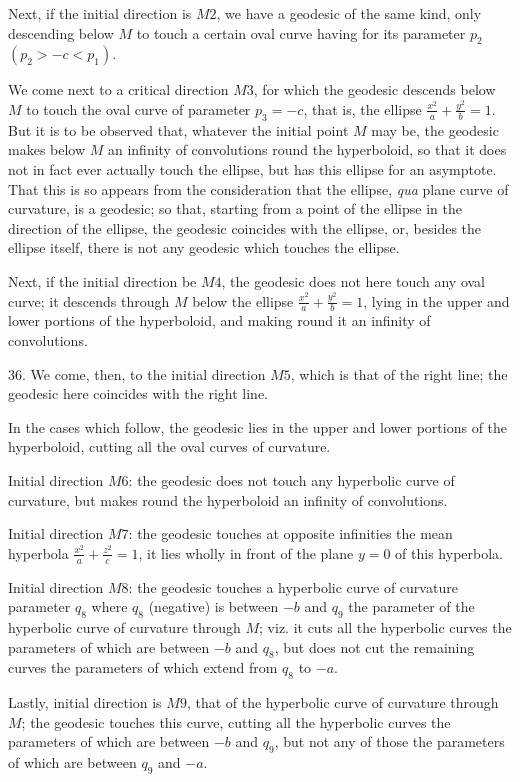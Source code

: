 \documentclass[11pt,a4paper]{article}
\begin{document}
Next, if the initial direction is $M2$, we have a geodesic of the same kind, only descending
below $M$ to touch a certain oval curve having for its parameter $p_2$ $(p_2>-c<p_1)$.

We come next to a critical direction $M3$, for which the geodesic descends below $M$ to
touch the oval curve of parameter $p_3=-c$, that is, the ellipse
$\frac{x^2}{a}+\frac{y^2}{b}=1$. But it is to be observed that, whatever the initial point
$M$ may be, the geodesic makes below $M$ an infinity of convolutions round the hyperboloid,
so that it does not in fact ever actually touch the ellipse, but has this ellipse for an
asymptote. That this is so appears from the consideration that the ellipse, \emph{qua} plane
curve of curvature, is a geodesic; so that, starting from a point of the ellipse in the
direction of the ellipse, the geodesic coincides with the ellipse, or, besides the ellipse
itself, there is not any geodesic which touches the ellipse.

Next, if the initial direction be $M4$, the geodesic does not here touch any oval curve;
it descends through $M$ below the ellipse $\frac{x^2}{a}+\frac{y^2}{b}=1$, lying in the
upper and lower portions of the hyperboloid, and making round it an infinity of convolutions.

36. We come, then, to the initial direction $M5$, which is that of the right line; the
geodesic here coincides with the right line.

In the cases which follow, the geodesic lies in the upper and lower portions of the
hyperboloid, cutting all the oval curves of curvature.

Initial direction $M6$: the geodesic does not touch any hyperbolic curve of curvature, but
makes round the hyperboloid an infinity of convolutions.

Initial direction $M7$: the geodesic touches at opposite infinities the mean hyperbola
$\frac{x^2}{a}+\frac{z^2}{c}=1$, it lies wholly in front of the plane $y=0$ of this hyperbola.

Initial direction $M8$: the geodesic touches a hyperbolic curve of curvature parameter
$q_8$ where $q_8$ (negative) is between $-b$ and $q_9$ the parameter of the hyperbolic
curve of curvature through $M$; viz. it cuts all the hyperbolic curves the parameters of
which are between $-b$ and $q_8$, but does not cut the remaining curves the parameters of
which extend from $q_8$ to $-a$.

Lastly, initial direction is $M9$, that of the hyperbolic curve of curvature through $M$;
the geodesic touches this curve, cutting all the hyperbolic curves the parameters of which
are between $-b$ and $q_9$, but not any of those the parameters of which are between $q_9$
and $-a$.
\end{document}
